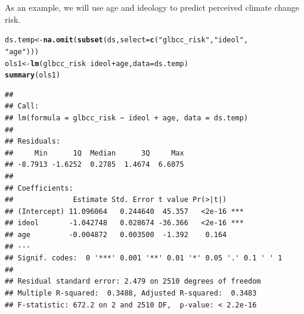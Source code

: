 \documentclass[11pt,openany]{book}\usepackage[]{graphicx}\usepackage[]{color}
\makeatletter
\newcommand{\hlstr}[1]{\textcolor[rgb]{0.192,0.494,0.8}{#1}}%
\newcommand{\hlopt}[1]{\textcolor[rgb]{0,0,0}{#1}}%
\newcommand{\hlstd}[1]{\textcolor[rgb]{0.345,0.345,0.345}{#1}}%
\newcommand{\hlkwb}[1]{\textcolor[rgb]{0.69,0.353,0.396}{#1}}%
\newcommand{\hlkwc}[1]{\textcolor[rgb]{0.333,0.667,0.333}{#1}}%
\newcommand{\hlkwd}[1]{\textcolor[rgb]{0.737,0.353,0.396}{\textbf{#1}}}%
\newenvironment{kframe}{%
 \def\at@end@of@kframe{}%
 \ifinner\ifhmode%
  \def\at@end@of@kframe{\end{minipage}}%
  \begin{minipage}{\columnwidth}%
 \fi\fi%
 \def\FrameCommand##1{\hskip\@totalleftmargin \hskip-\fboxsep
 \colorbox{shadecolor}{##1}\hskip-\fboxsep
     \hskip-\linewidth \hskip-\@totalleftmargin \hskip\columnwidth}%
 \MakeFramed {\advance\hsize-\width
   \@totalleftmargin\z@ \linewidth\hsize
   \@setminipage}}%
 {\par\unskip\endMakeFramed%
 \at@end@of@kframe}
\newenvironment{knitrout}{}{} %
\renewenvironment{knitrout}{\begin{singlespace}}{\end{singlespace}}
\makeatother
\begin{document}
\begin{grbox}
\end{grbox}

As an example, we will use age and ideology to predict perceived climate change risk. 

\begin{knitrout}
\color{fgcolor}\begin{kframe}
\begin{alltt}
\hlstd{ds.temp} \hlkwb{<-} \hlkwd{na.omit}\hlstd{(}\hlkwd{subset}\hlstd{(ds,} \hlkwc{select} \hlstd{=} \hlkwd{c}\hlstd{(}\hlstr{"glbcc_risk"}\hlstd{,} \hlstr{"ideol"}\hlstd{,}
    \hlstr{"age"}\hlstd{)))}
\hlstd{ols1} \hlkwb{<-} \hlkwd{lm}\hlstd{(glbcc_risk} \hlopt{~} \hlstd{ideol} \hlopt{+} \hlstd{age,} \hlkwc{data} \hlstd{= ds.temp)}
\hlkwd{summary}\hlstd{(ols1)}
\end{alltt}
\begin{verbatim}
## 
## Call:
## lm(formula = glbcc_risk ~ ideol + age, data = ds.temp)
## 
## Residuals:
##     Min      1Q  Median      3Q     Max 
## -8.7913 -1.6252  0.2785  1.4674  6.6075 
## 
## Coefficients:
##              Estimate Std. Error t value Pr(>|t|)    
## (Intercept) 11.096064   0.244640  45.357   <2e-16 ***
## ideol       -1.042748   0.028674 -36.366   <2e-16 ***
## age         -0.004872   0.003500  -1.392    0.164    
## ---
## Signif. codes:  0 '***' 0.001 '**' 0.01 '*' 0.05 '.' 0.1 ' ' 1
## 
## Residual standard error: 2.479 on 2510 degrees of freedom
## Multiple R-squared:  0.3488,	Adjusted R-squared:  0.3483 
## F-statistic: 672.2 on 2 and 2510 DF,  p-value: < 2.2e-16
\end{verbatim}
\end{kframe}
\end{knitrout}
\end{document}
